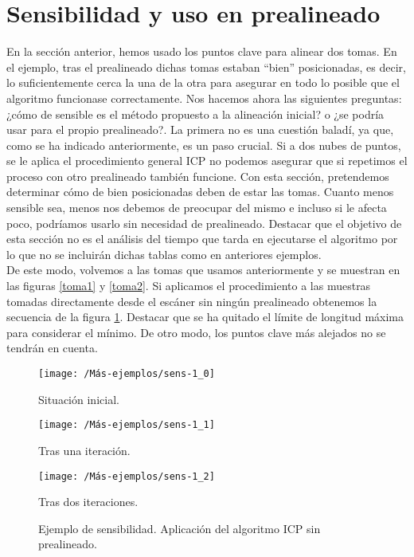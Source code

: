 \section{Sensibilidad y uso en prealineado}
En la sección anterior, hemos usado los puntos clave para alinear dos tomas. En el ejemplo, tras el prealineado dichas tomas estaban ``bien'' posicionadas, es decir, lo suficientemente cerca la una de la otra para asegurar en todo lo posible que el algoritmo funcionase correctamente. Nos hacemos ahora las siguientes preguntas: ¿cómo de sensible es el método propuesto a la alineación inicial? o ¿se podría usar para el propio prealineado?. La primera no es una cuestión baladí, ya que, como se ha indicado anteriormente, es un paso crucial. Si a dos nubes de puntos, se le aplica el procedimiento general ICP no podemos asegurar que si repetimos el proceso con otro prealineado  también funcione. Con esta sección, pretendemos determinar cómo de bien posicionadas deben de estar las tomas. Cuanto menos sensible sea, menos nos debemos de preocupar del mismo e incluso si le afecta poco, podríamos usarlo sin necesidad de prealineado. Destacar que el objetivo de esta sección no es el análisis del tiempo que tarda en ejecutarse el algoritmo por lo que no se incluirán dichas tablas como en anteriores ejemplos.\\

De este modo, volvemos a las tomas que usamos anteriormente y se muestran en las figuras \ref{toma1} y \ref{toma2}. Si aplicamos el procedimiento a las muestras tomadas directamente desde el escáner sin ningún prealineado obtenemos la secuencia de la figura \ref{fig:sensi-1}. Destacar que se ha quitado el límite de longitud máxima para considerar el mínimo. De otro modo, los puntos clave más alejados no se tendrán en cuenta. \\

\begin{figure}[h!]	
	\begin{minipage}[b]{0.5\textwidth}
		\centering		
		\texttt{[image: /Más-ejemplos/sens-1\_0]} 
		\caption*{Situación inicial.}
	\end{minipage}
	\begin{minipage}[b]{0.5\textwidth}
		\centering
		\texttt{[image: /Más-ejemplos/sens-1\_1]}
		\caption*{Tras una iteración.}
	\end{minipage}
	\begin{center}
		\begin{minipage}[b]{0.5\textwidth}
		\centering		
		\texttt{[image: /Más-ejemplos/sens-1\_2]} 
		\caption*{Tras dos iteraciones.}
	\end{minipage}
	\end{center}
	\caption{Ejemplo de sensibilidad. Aplicación del algoritmo ICP sin prealineado.}
	\label{fig:sensi-1}
\end{figure}


